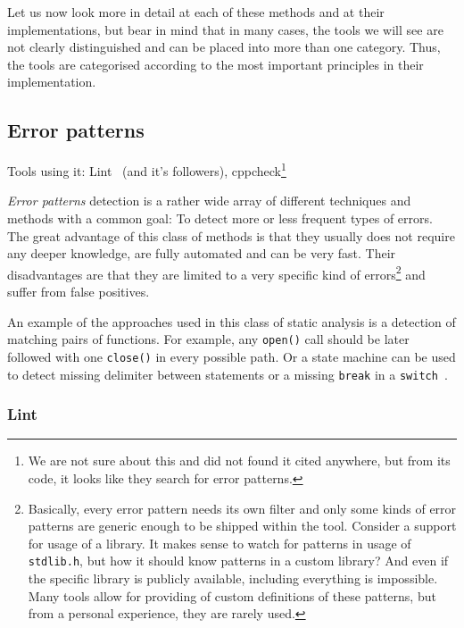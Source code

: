 Let us now look more in detail at each of these methods and at their implementations, but bear in mind that in many cases, the tools we will see are not clearly distinguished and can be placed into more than one category. Thus, the tools are categorised according to the most important principles in their implementation.

\subsection{Error patterns}

Tools using it: Lint~\cite{KrenaVojnarOverview} (and it's followers), cppcheck\footnote{We are not sure about this and did not found it cited anywhere, but from its code, it looks like they search for error patterns.}

{\em Error patterns} detection is a rather wide array of different
techniques and methods with a common goal: To detect more or less frequent
types of errors. The great advantage of this class of methods is that they
usually does not require any deeper knowledge, are fully automated and can
be very fast. Their disadvantages are that they are limited to a very
specific kind of errors\footnote{Basically, every error pattern needs its
own filter and only some kinds of error patterns are generic enough to be
shipped within the tool. Consider a support for usage of a library. It
makes sense to watch for patterns in usage of {\tt stdlib.h}, but how it
should know patterns in a custom library? And even if the specific library
is publicly available, including everything is impossible. Many tools allow
for providing of custom definitions of these patterns, but from a personal
experience, they are rarely used.} and suffer from false positives.

An example of the approaches used in this class of static analysis is a detection of matching pairs of functions. For example, any {\tt open()} call should be later followed with one {\tt close()} in every possible path. Or a state machine can be used to detect missing delimiter between statements or a missing {\tt break} in a {\tt switch}~\cite{dynamine}.

\subsubsection{Lint}

